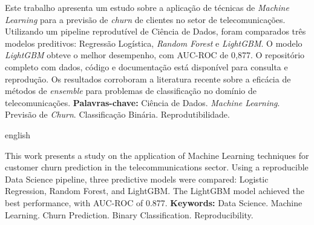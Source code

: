 \documentclass[
    12pt,
    oneside,
    a4paper,
    english,
    brazilian
    ]{abntex2}
\numberwithin{equation}{chapter}
\begin{document}
\pretextual
\maketitle
\newpage

\begin{resumo}
\noindent Este trabalho apresenta um estudo sobre a aplicação de técnicas de \textit{Machine Learning} para a previsão de \textit{churn} de clientes no setor de telecomunicações. Utilizando um pipeline reprodutível de Ciência de Dados, foram comparados três modelos preditivos: Regressão Logística, \textit{Random Forest} e \textit{LightGBM}. O modelo \textit{LightGBM} obteve o melhor desempenho, com AUC-ROC de 0,877. O repositório completo com dados, código e documentação está disponível para consulta e reprodução. Os resultados corroboram a literatura recente sobre a eficácia de métodos de \textit{ensemble} para problemas de classificação no domínio de telecomunicações.
\newline
\noindent \textbf{Palavras-chave:} Ciência de Dados. \textit{Machine Learning}. Previsão de \textit{Churn}. Classificação Binária. Reprodutibilidade.
\end{resumo}

\begin{otherlanguage*}{english}
\begin{resumo}[Abstract]
\noindent This work presents a study on the application of Machine Learning techniques for customer churn prediction in the telecommunications sector. Using a reproducible Data Science pipeline, three predictive models were compared: Logistic Regression, Random Forest, and LightGBM. The LightGBM model achieved the best performance, with AUC-ROC of 0.877. 
\newline
\noindent \textbf{Keywords:} Data Science. Machine Learning. Churn Prediction. Binary Classification. Reproducibility.
\end{resumo}
\end{otherlanguage*}
\newpage

\listoffigures*
\newpage

\listoftables*
\newpage
\end{document}
